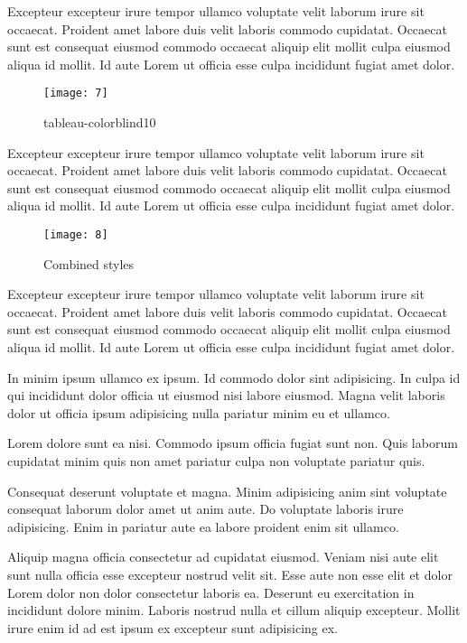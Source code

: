 Excepteur excepteur irure tempor ullamco voluptate velit laborum irure sit occaecat. Proident amet labore duis velit laboris commodo cupidatat. Occaecat sunt est consequat eiusmod commodo occaecat aliquip elit mollit culpa eiusmod aliqua id mollit. Id aute Lorem ut officia esse culpa incididunt fugiat amet dolor.

\begin{figure}[!h]
    \centering
    \texttt{[image: 7]}
    \caption{tableau-colorblind10}
    \label{fig:tableau-colorblind10}
\end{figure}

Excepteur excepteur irure tempor ullamco voluptate velit laborum irure sit occaecat. Proident amet labore duis velit laboris commodo cupidatat. Occaecat sunt est consequat eiusmod commodo occaecat aliquip elit mollit culpa eiusmod aliqua id mollit. Id aute Lorem ut officia esse culpa incididunt fugiat amet dolor.

\begin{figure}[!h]
    \centering
    \texttt{[image: 8]}
    \caption{Combined styles}
    \label{fig:combined_styles}
\end{figure}

Excepteur excepteur irure tempor ullamco voluptate velit laborum irure sit occaecat. Proident amet labore duis velit laboris commodo cupidatat. Occaecat sunt est consequat eiusmod commodo occaecat aliquip elit mollit culpa eiusmod aliqua id mollit. Id aute Lorem ut officia esse culpa incididunt fugiat amet dolor.

In minim ipsum ullamco ex ipsum. Id commodo dolor sint adipisicing. In culpa id qui incididunt dolor officia ut eiusmod nisi labore eiusmod. Magna velit laboris dolor ut officia ipsum adipisicing nulla pariatur minim eu et ullamco.

Lorem dolore sunt ea nisi. Commodo ipsum officia fugiat sunt non. Quis laborum cupidatat minim quis non amet pariatur culpa non voluptate pariatur quis.

Consequat deserunt voluptate et magna. Minim adipisicing anim sint voluptate consequat laborum dolor amet ut anim aute. Do voluptate laboris irure adipisicing. Enim in pariatur aute ea labore proident enim sit ullamco.

Aliquip magna officia consectetur ad cupidatat eiusmod. Veniam nisi aute elit sunt nulla officia esse excepteur nostrud velit sit. Esse aute non esse elit et dolor Lorem dolor non dolor consectetur laboris ea. Deserunt eu exercitation in incididunt dolore minim. Laboris nostrud nulla et cillum aliquip excepteur. Mollit irure enim id ad est ipsum ex excepteur sunt adipisicing ex.


